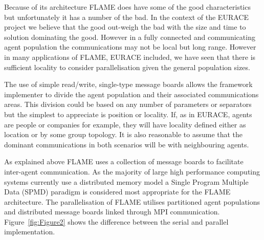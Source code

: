 Because of its architecture FLAME does have some of the good characteristics but unfortunately it has a number of the bad. In the context of the EURACE project we believe that the good out-weigh the bad with the size and time to solution dominating the good. However in a fully connected and communicating agent population the communications may not be local but long range. However in many applications of FLAME, EURACE included, we have seen that there is sufficient locality to consider parallelisation given the general population sizes.

The use of simple read/write, single-type message boards allows the framework implementer to divide the agent population and their associated communications areas. This division could be based on any number of parameters or separators but the simplest to appreciate is position or locality. If, as in EURACE, agents are people or companies for example, they will have locality defined either as location or by some group topology. It is also reasonable to assume that the dominant communications in both scenarios will be with neighbouring agents.

As explained above FLAME uses a collection of message boards to facilitate inter-agent communication. As the majority of large high performance computing systems currently use a distributed memory model a Single Program Multiple Data (SPMD) paradigm is considered most appropriate for the FLAME architecture. The parallelisation of FLAME utilises partitioned agent populations and distributed message boards linked through MPI communication. Figure~\ref{fig:Figure2} shows the difference between the serial and parallel implementation.

